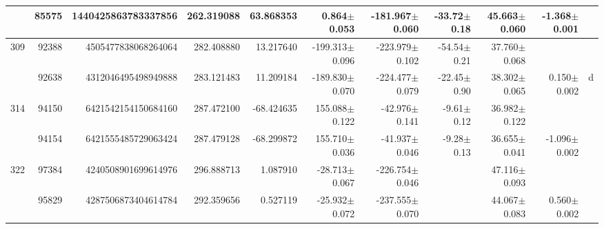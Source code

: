 \documentclass{ws-ijmpd}
\begin{document}
\begin{landscape}
\begin{longtable}{rrrrrrrrrrl}
            &   85575 &      1440425863783337856 &                   262.319088 &                    63.868353 &                  0.864$\pm$0.053 &               -181.967$\pm$0.060 &         -33.72$\pm$  0.18 &        45.663$\pm$0.060 &                          -1.368$\pm$0.001 &                                                    \\
 \hline 309 &   92388 &      4505477838068264064 &                   282.408880 &                    13.217640 &               -199.313$\pm$0.096 &               -223.979$\pm$0.102 &         -54.54$\pm$  0.21 &        37.760$\pm$0.068 &                                           &                                                    \\
            &   92638 &      4312046495498949888 &                   283.121483 &                    11.209184 &               -189.830$\pm$0.070 &               -224.477$\pm$0.079 &         -22.45$\pm$  0.90 &        38.302$\pm$0.065 &                           0.150$\pm$0.002 &                                                  d \\
 \hline 314 &   94150 &      6421542154150684160 &                   287.472100 &                   -68.424635 &                155.088$\pm$0.122 &                -42.976$\pm$0.141 &          -9.61$\pm$  0.12 &        36.982$\pm$0.122 &                                           &                                                    \\
            &   94154 &      6421555485729063424 &                   287.479128 &                   -68.299872 &                155.710$\pm$0.036 &                -41.937$\pm$0.046 &          -9.28$\pm$  0.13 &        36.655$\pm$0.041 &                          -1.096$\pm$0.002 &                                                    \\
 \hline 322 &   97384 &      4240508901699614976 &                   296.888713 &                     1.087910 &                -28.713$\pm$0.067 &               -226.754$\pm$0.046 &                           &        47.116$\pm$0.093 &                                           &                                                    \\
            &   95829 &      4287506873404614784 &                   292.359656 &                     0.527119 &                -25.932$\pm$0.072 &               -237.555$\pm$0.070 &                           &        44.067$\pm$0.083 &                           0.560$\pm$0.002 &                                                    \\

\end{longtable}
\end{landscape}
\end{document}
